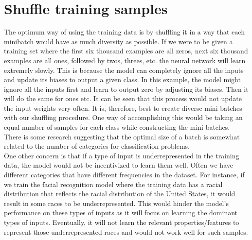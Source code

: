 {\centering{}\par}

\section{Shuffle training samples} 
The optimum way of using the training data is by shuffling it in a way that each minibatch would have as much diversity as possible. 
If we were to be given a training set where the first six thousand examples are all zeros, next six thousand examples are all ones, followed by twos, threes, etc. the neural network will learn extremely slowly. 
This is because the model can completely ignore all the inputs and update its biases to output a given class. 
In this example, the model might ignore all the inputs first and learn to output zero by adjusting its biases. 
Then it will do the same for ones etc. It can be seen that this process would not update the input weights very often. 
It is, therefore, best to create diverse mini batches with our shuffling procedure. 
One way of accomplishing this would be taking an equal number of samples for each class while constructing the mini-batches. 
There is some research suggesting that the optimal size of a batch is somewhat related to the number of categories for classification problems.\\

One other concern is that if a type of input is underrepresented in the training data, the model would not be incentivized to learn them well. 
Often we have different categories that have different frequencies in the dataset. 
For instance, if we train the facial recognition model where the training data has a racial distribution that reflects the racial distribution of the United States, it would result in some races to be underrepresented. 
This would hinder the model’s performance on these types of inputs as it will focus on learning the dominant types of inputs. 
Eventually, it will not learn the relevant properties/features to represent those underrepresented races and would not work well for such samples.\\


